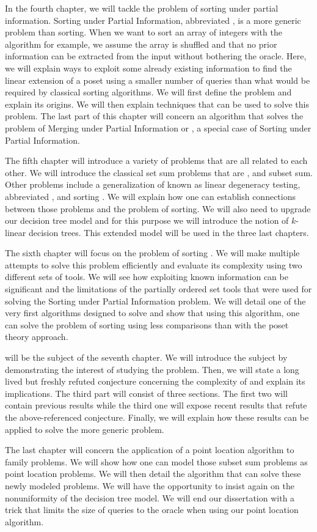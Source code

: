 In the fourth chapter, we will tackle the problem of sorting under partial
information. Sorting under Partial Information, abbreviated , is
a more generic problem than sorting. When we want to sort an array of integers
with the \quicksort algorithm for example, we assume the array is shuffled and
that no prior information can be extracted from the input without bothering the
oracle. Here, we will explain ways to exploit some already existing information
to find the linear extension of a poset using a smaller number of queries than
what would be required by classical sorting algorithms. We will first define
the problem and explain its origins. We will then explain techniques that can
be used to solve this problem. The last part of this chapter will concern an
algorithm that solves the problem of Merging under Partial Information or
, a special case of Sorting under Partial Information.

The fifth chapter will introduce a variety of problems that are all related to
each other. We will introduce the classical set sum problems that are
\threeSUM, \kSUM and subset sum. Other problems include a generalization of
\kSUM known as linear degeneracy testing, abbreviated \kLDT, and sorting \XY.
We will explain how one can establish connections between those problems and the problem
of sorting. We will also need to upgrade our decision tree model and for this
purpose we will introduce the notion of \(k\)-linear decision trees. This
extended model will be used in the three last chapters.

The sixth chapter will focus on the problem of sorting \XY. We will make
multiple attempts to solve this problem efficiently and evaluate its complexity
using two different sets of tools. We will see how exploiting known information
can be significant and the limitations of the partially ordered set tools that
were used for solving the Sorting under Partial Information problem. We will
detail one of the very first algorithms designed to solve  and
show that using this algorithm, one can solve the problem of sorting \XY
using less comparisons than with the poset theory approach.

\threeSUM will be the subject of the seventh chapter. We will introduce the
subject by demonstrating the interest of studying the \threeSUM problem. Then,
we will state a long lived but freshly refuted conjecture concerning the
complexity of \threeSUM and explain its implications. The third part will
consist of three sections. The first two will contain previous results while
the third one will expose recent results that refute the above-referenced
conjecture. Finally, we will explain how these results can be applied to solve
the more generic \kLDT problem.

The last chapter will concern the application of a point location algorithm to
\kSUM family problems. We will show how one can model those subset sum
problems as point location problems. We will then detail the algorithm that
can solve these newly modeled problems. We will have the opportunity to insist again
on the nonuniformity of the decision tree model. We will end our dissertation
with a trick that limits the size of queries to the oracle when
using our point location algorithm.
